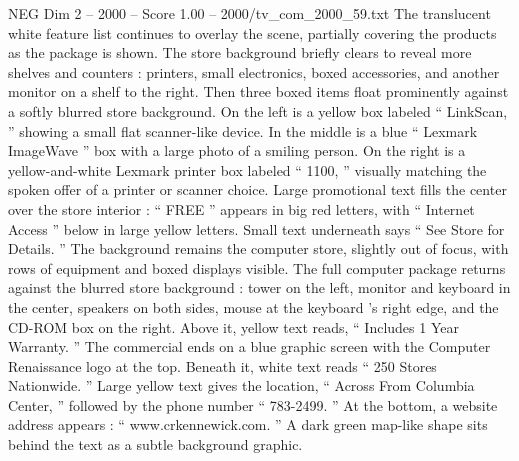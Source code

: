 \begin{textsample}{NEG Dim 2 – 2000 – Score 1.00 – 2000/tv\_com\_2000\_59.txt}
The translucent white feature list continues to overlay the scene, partially covering the products as the package is shown.
The store background briefly clears to reveal more shelves and counters : printers, small electronics, boxed accessories, and another monitor on a shelf to the right.
Then three boxed items float prominently against a softly blurred store background.
On the left is a yellow box labeled “ LinkScan, ” showing a small flat scanner-like device.
In the middle is a blue “ Lexmark ImageWave ” box with a large photo of a smiling person.
On the right is a yellow-and-white Lexmark printer box labeled “ 1100, ” visually matching the spoken offer of a printer or scanner choice.
Large promotional text fills the center over the store interior : “ FREE ” appears in big red letters, with “ Internet Access ” below in large yellow letters.
Small text underneath says “ See Store for Details. ” The background remains the computer store, slightly out of focus, with rows of equipment and boxed displays visible.
The full computer package returns against the blurred store background : tower on the left, monitor and keyboard in the center, speakers on both sides, mouse at the keyboard ’s right edge, and the CD-ROM box on the right.
Above it, yellow text reads, “ Includes 1 Year Warranty. ” The commercial ends on a blue graphic screen with the Computer Renaissance logo at the top.
Beneath it, white text reads “ 250 Stores Nationwide. ” Large yellow text gives the location, “ Across From Columbia Center, ” followed by the phone number “ 783-2499. ” At the bottom, a website address appears : “ www.crkennewick.com. ” A dark green map-like shape sits behind the text as a subtle background graphic.

\end{textsample}
